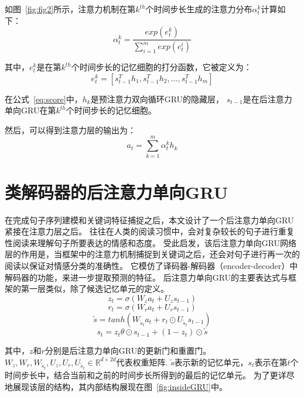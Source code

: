 如图~\ref{fig:fig2}所示，注意力机制在第${k^{th}}$个时间步长生成的注意力分布${\alpha_{t}^{k}}$计算如下：
\begin{equation}
    \alpha_{t}^{k}=\frac{exp\left( e_{t}^{k} \right)}{\sum_{i=1}^{m}exp\left( e_{t}^{i} \right)}
\end{equation}

其中，${e_{t}^{k}}$是在第${k^{th}}$个时间步长的记忆细胞的打分函数，它被定义为：
\begin{equation}
    e_{t}^{k}=\left[s_{t-1}^{T}h_{1},s_{t-1}^{T}h_{2},...,s_{t-1}^{T}h_{m}\right]
    \label{eq:score}
\end{equation}

在公式~\ref{eq:score}中，${h_{k}}$是预注意力双向循环GRU的隐藏层，
${s_{t-1}}$是在后注意力单向GRU在第${k^{th}}$个时间步长的记忆细胞。

然后，可以得到注意力层的输出为：
\begin{equation}
    a_{t}=\sum_{k=1}^{m}\alpha_{t}^{k}h_{k}
\end{equation}

\section{类解码器的后注意力单向GRU}
在完成句子序列建模和关键词特征捕捉之后，本文设计了一个后注意力单向GRU紧接在注意力层之后。
往往在人类的阅读习惯中，会对复杂较长的句子进行重复性阅读来理解句子所要表达的情感和态度。
受此启发，该后注意力单向GRU网络层的作用是，当框架中的注意力机制捕捉到关键词之后，还会对句子进行再一次的阅读以保证对情感分类的准确性。
它模仿了译码器-解码器（encoder-decoder）中解码器的功能，来进一步提取预测的特征。
后注意力单向GRU的主要表达式与框架的第一层类似，除了候选记忆单元的定义。
\begin{equation}
    z_{t}=\sigma\left(W_{z}a_{t}+U_{z}s_{t-1}\right)
\end{equation}
\begin{equation}
    r_{t}=\sigma\left(W_{r}a_{t}+U_{r}s_{t-1}\right)
\end{equation}
\begin{equation}
    \widetilde{s}=tanh\left(W_{\widetilde{s}_{t}}a_{t} + r_{t}\odot U_{\widetilde{s}_{t}}s_{t-1}\right)
\end{equation}
\begin{equation}
    s_{t}=z_{t}\theta \odot s_{t-1}+\left( 1-z_{t} \right )\odot\widetilde{s}
\end{equation}

其中，${z}$和${r}$分别是后注意力单向GRU的更新门和重置门。
${W_{z},W_{r},W_{\widetilde{s}_{t}},U_{z},U_{r},U_{\widetilde{s}_{t}}\in \mathbb{R}^{d\times2d}}$代表权重矩阵.
${\widetilde{s}}$表示新的记忆单元，${s_{t}}$表示在第${t}$个时间步长中，结合当前和之前的时间步长所得到的最后的记忆单元。
为了更详尽地展现该层的结构，其内部结构展现在图~\ref{fig:insideGRU}中。

